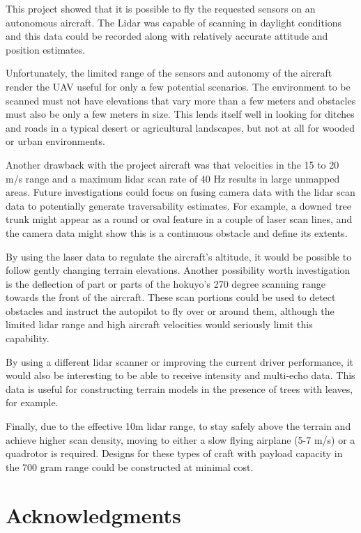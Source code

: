 \documentclass[a4paper,11pt]{report}
\begin{document}
This project showed that it is possible to fly the requested sensors on an autonomous aircraft. The Lidar was capable of scanning in daylight conditions and this data could be recorded along with relatively accurate attitude and position estimates.

Unfortunately, the limited range of the sensors and autonomy of the aircraft render the UAV useful for only a few potential scenarios. The environment to be scanned must not have elevations that vary more than a few meters and obstacles must also be only a few meters in size. This lends itself well in looking for ditches and roads in a typical desert or agricultural landscapes, but not at all for wooded or urban environments.

Another drawback with the project aircraft was that velocities in the 15 to 20 m/s range and a maximum lidar scan rate of 40 Hz results in large unmapped areas. Future investigations could focus on fusing camera data with the lidar scan data to potentially generate traversability estimates. For example, a downed tree trunk might appear as a round or oval feature in a couple of laser scan lines, and the camera data might show this is a continuous obstacle and define its extents.

By using the laser data to regulate the aircraft's altitude, it would be possible to follow gently changing terrain elevations. Another possibility worth investigation is the deflection of part or parts of the hokuyo's 270 degree scanning range towards the front of the aircraft. These scan portions could be used to detect obstacles and instruct the autopilot to fly over or around them, although the limited lidar range and high aircraft velocities would seriously limit this capability.

By using a different lidar scanner or improving the current driver performance, it would also be interesting to be able to receive intensity and multi-echo data. This data is useful for constructing terrain models in the presence of trees with leaves, for example.

Finally, due to the effective 10m lidar range, to stay safely above the terrain and achieve higher scan density, moving to either a slow flying airplane (5-7 m/s) or a quadrotor is required. Designs for these types of craft with payload capacity in the 700 gram range could be constructed at minimal cost.

\chapter{Acknowledgments}
\end{document}
